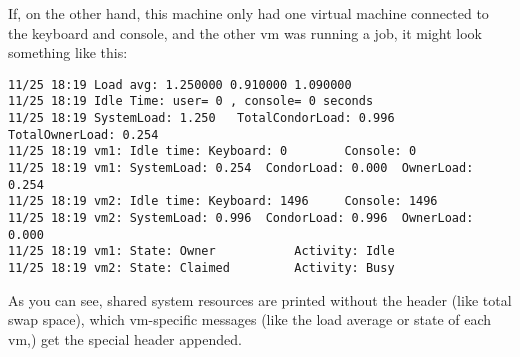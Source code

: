 If, on the other hand, this machine only had one virtual machine
connected to the keyboard and console, and the other vm was running a
job, it might look something like this:
\begin{verbatim}
11/25 18:19 Load avg: 1.250000 0.910000 1.090000
11/25 18:19 Idle Time: user= 0 , console= 0 seconds
11/25 18:19 SystemLoad: 1.250   TotalCondorLoad: 0.996  TotalOwnerLoad: 0.254
11/25 18:19 vm1: Idle time: Keyboard: 0        Console: 0
11/25 18:19 vm1: SystemLoad: 0.254  CondorLoad: 0.000  OwnerLoad: 0.254
11/25 18:19 vm2: Idle time: Keyboard: 1496     Console: 1496
11/25 18:19 vm2: SystemLoad: 0.996  CondorLoad: 0.996  OwnerLoad: 0.000
11/25 18:19 vm1: State: Owner           Activity: Idle
11/25 18:19 vm2: State: Claimed         Activity: Busy
\end{verbatim}

As you can see, shared system resources are printed without the header
(like total swap space), which vm-specific messages (like the load
average or state of each vm,) get the special header appended.  
